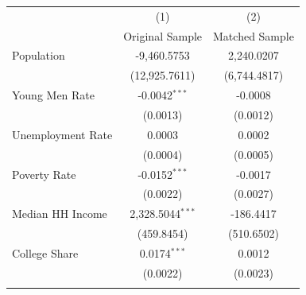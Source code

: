 

\begin{tabular}{@{\extracolsep{5pt}} lcc} 
\toprule
\midrule
 & (1) & (2) \\
   & Original Sample  & Matched Sample  \\ 
\midrule

\enspace Population & -9,460.5753 & 2,240.0207  \\ 
 & (12,925.7611) & (6,744.4817) \\ 
 \addlinespace

\enspace Young Men Rate & -0.0042$^{***}$ & -0.0008 \\ 
  & (0.0013) & (0.0012) \\ 
 \addlinespace  

\enspace Unemployment Rate & 0.0003 & 0.0002 \\ 
 & (0.0004) & (0.0005) \\ 
 \addlinespace

\enspace Poverty Rate & -0.0152$^{***}$ & -0.0017 \\ 
 & (0.0022) & (0.0027) \\ 
 \addlinespace

\enspace Median HH Income & 2,328.5044$^{***}$ & -186.4417 \\ 
  & (459.8454) & (510.6502) \\ 
 \addlinespace

\enspace College Share & 0.0174$^{***}$ & 0.0012 \\ 
  & (0.0022) & (0.0023) \\ 
 \addlinespace
 
\bottomrule 
\end{tabular}
